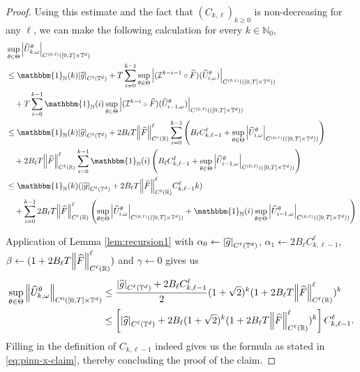 \documentclass{article}
\numberwithin{equation}{section}
\newcommand{\T}{\mathbb{T}}
\newcommand{\R}{\mathbb{R}}
\newcommand{\N}{\mathbb{N}}
\newcommand{\cI}{\mathcal{I}}
\newcommand{\1}{\mathbbm{1}}
\newcommand{\Fhat}{\widehat{F}}
\newcommand{\Uhat}{\widehat{U}}
\newcommand{\ghat}{\widehat{g}}
\begin{document}
\begin{proof}
Using this estimate and the fact that $(C_{k,\ell})_{k\geq0}$ is non-decreasing for any $\ell$, we can make the following calculation for every $k\in\N_0$,
\begin{equation}
    \begin{split}
        &\sup_{\theta\in\Theta} \abs{ \Uhat^\theta_{k,\omega}}_{C^{(0,\ell)}([0,T]\times\T^d)} \\&\leq \1_{\N}(k)\abs{\ghat}_{C^\ell(\T^d)} + T \sum_{i=0}^{k-1} \sup_{\theta\in\Theta}\abs{ (\cI^{k-i-1}\circ\Fhat)(\Uhat^{\theta}_{i,\omega})}_{C^{(0,\ell)}(([0,T]\times\T^d))}\\&\quad +T \sum_{i=0}^{k-1}\1_{\N}(i)\sup_{\theta\in\Theta}\abs{ (\cI^{k-i}\circ\Fhat)(\Uhat^{\theta}_{i-1,\omega})}_{C^{(0,\ell)}(([0,T]\times\T^d))}\\
        &\leq \1_{\N}(k)\abs{\ghat}_{C^\ell(\T^d)} + 2B_\ell T\norm{\Fhat}_{C^\ell(\R)}^\ell \sum_{i=0}^{k-1} \left(B_\ell C_{k,\ell-1}^\ell+\sup_{\theta\in\Theta}\abs{ \Uhat^{\theta}_{i,\omega}}_{C^{(0,\ell)}(([0,T]\times\T^d))}\right)\\
        &\quad +2B_\ell T\norm{\Fhat}_{C^\ell(\R)}^\ell \sum_{i=0}^{k-1} \1_{\N}(i)\left(B_\ell C_{k,\ell-1}^\ell+\sup_{\theta\in\Theta}\abs{ \Uhat^{\theta}_{i-1,\omega}}_{C^{(0,\ell)}(([0,T]\times\T^d))}\right)\\
        &\leq \1_{\N}(k)(\abs{\ghat}_{C^\ell(\T^d)} + 2B_\ell T \norm{\Fhat}_{C^\ell(\R)}^\ell C_{k,\ell-1}^\ell k)\\
        &\quad + \sum_{i=0}^{k-1}2B_\ell T\norm{\Fhat}_{C^\ell(\R)}^\ell\left(\sup_{\theta\in\Theta}\abs{ \Uhat^{\theta}_{i,\omega}}_{C^{(0,\ell)}(([0,T]\times\T^d))} + \1_{\N}(i)\sup_{\theta\in\Theta}\abs{ \Uhat^{\theta}_{i-1,\omega}}_{C^{(0,\ell)}(([0,T]\times\T^d))}\right)
    \end{split}
\end{equation}

Application of Lemma \ref{lem:recursion1} with $\alpha_0\leftarrow \abs{\ghat}_{C^\ell(\T^d)}$, $\alpha_1 \leftarrow  2B_\ell C_{k,\ell-1}^\ell $, $\beta \leftarrow (1+2B_\ell T\norm{\Fhat}_{C^\ell(\R)}^\ell)$ and $\gamma \leftarrow 0$ gives us
\begin{equation}
\begin{split}
    \sup_{\theta\in\Theta} \norm{ \Uhat^\theta_{k,\omega}}_{C^{0}([0,T]\times\T^d)} &\leq \frac{\abs{\ghat}_{C^\ell(\T^d)} + 2B_\ell C_{k,\ell-1}^\ell}{2}(1+\sqrt{2})^k (1+2B_\ell T\norm{\Fhat}_{C^\ell(\R)}^\ell)^k \\
    &\leq \left[\abs{\ghat}_{C^\ell(\T^d)}+2B_\ell (1+\sqrt{2})^k (1+2B_\ell T\norm{\Fhat}_{C^\ell(\R)}^\ell)^k\right]C_{k,\ell-1}^\ell. 
\end{split}
\end{equation}
Filling in the definition of $C_{k,\ell-1}$ indeed gives us the formula as stated in \eqref{eq:pinn-x-claim}, thereby concluding the proof of the claim. 
\end{proof}
\end{document}
